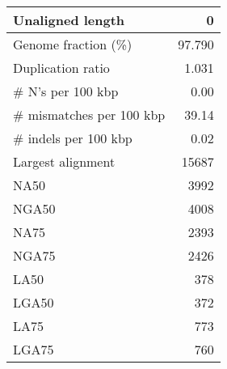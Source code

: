 \documentclass[12pt,a4paper]{article}
\begin{document}
\begin{table}[ht]
\begin{center}
\begin{tabular}{|l*{1}{|r}|}
Unaligned length & 0 \\ \hline
Genome fraction (\%) & 97.790 \\ \hline
Duplication ratio & 1.031 \\ \hline
\# N's per 100 kbp & 0.00 \\ \hline
\# mismatches per 100 kbp & 39.14 \\ \hline
\# indels per 100 kbp & 0.02 \\ \hline
Largest alignment & 15687 \\ \hline
NA50 & 3992 \\ \hline
NGA50 & 4008 \\ \hline
NA75 & 2393 \\ \hline
NGA75 & 2426 \\ \hline
LA50 & 378 \\ \hline
LGA50 & 372 \\ \hline
LA75 & 773 \\ \hline
LGA75 & 760 \\ \hline
\end{tabular}
\end{center}
\end{table}
\end{document}
